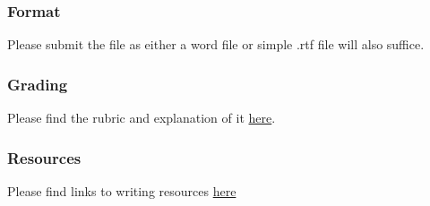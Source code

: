 \documentclass[]{article}
\begin{document}
\subsubsection{Format}\label{format}

Please submit the file as either a word file or simple .rtf file will
also suffice.

\subsubsection{Grading}\label{grading}

Please find the rubric and explanation of it
\href{/Teaching/Grading/}{here}.

\subsubsection{Resources}\label{resources}

Please find links to writing resources \href{/Teaching/Resources/}{here}
\end{document}
